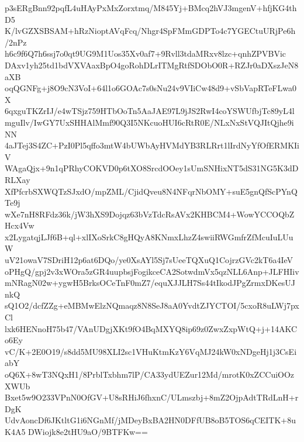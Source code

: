 p3sERgBnn92pqfL4uHAyPxMxZorxtmq/M845Yj+BMcq2hVJ3mgenV+hfjKG4thD5
K/lvGZXSBSAM+hRzNioptAVqFcq/Nhgr4SpFMmGDPTo4c7YGECtuURjPe6h/2nPz
h6c9f6Q7h6ssj7o0qt9UG9M1Uos35Xv0af7+9Rvll3tdaMRxv8lzc+qnhZPVBVic
DAxv1yh25td1bdVXVAaxBpO4goRohDLrITMgRtfSDObO0R+RZJr0aDXszJeN8aXB
oqQGNFg+j8O9cN3VoI+64l1o6GOAc7s0sNu24v9VIiCw48d9+vSbVapRTeFLwa0X
6qxguTKZrIJ/e4wTSjz759HTbOoTn5AaJAE97L9jJS2RwI4coYSWUfbjTc89yL4l
mguIlv/IwGY7UxSHHAlMmf90Q3I5NKcuoHUI6cRtR0E/NLxNxStVQJItQjhe9iNN
4aJTej3S4ZC+PzI0Pl5qffo3mtW4bUWbAyHVMdYB3RLRrt1lIrdNyYfOfERMKIiV
WAgaQjx+9n1qPRhyCOKVD0p6tXO8SrcdOOey1sUmSNHixNT5dS31NG5K3dDRLXay
XfPfcrbSXWQTzSJxdO/mpZML/CjidQveu8N4NFqrNbOMY+suE5gnQfScPYnQTe9j
wXe7nH8RFdz36k/jW3hXS9Dojqz63bVzTdcRsAVx2KHBCM4+WowYCCOQbZHcx4Vw
x2LygatqjLJf6B+ql+xlIXoSrkC8gHQyA8KNmxLhzZ4swiiRWGmfrZfMcuIuLUuW
uV21owaV7SDriH12p6at6DQo/ye0XsAYl5Sj7sUeeTQXuQ1CojrzGVc2kT6a4IeV
oPHgQ/gpj2v3xWOra5zGR4uupbsjFogikceCA2SotwdmVx5qzNLL6Anp+JLFHIiv
mNRagN02w+ygwH5BrksOCeTnF0mZ7/equXJJLH7Ss44tIkodJPgZrmxDKesUJnkQ
sQ1O2/dcfZZg+eMBMwElzNQmaqz8N8SeJ8aA0YvdtZJYCTOI/5cxoR8uLWj7pxCl
lxk6HENnoH75b47/VAnUDgjXKt9fO4BqMXYQ8ip69z0ZwxZxpWtQ+j+14AKCo6Ey
vC/K+2E0O19/s8dd5MU98XLI2sc1VHuKtmKzY6VqMJ24kW0xNDgeHj1j3CsEiabY
oQ6X+8wT3NQxH1/8PrblTxbhm7lP/CA33ydUEZur12Md/mrotK0xZCCuiOOzXWUb
Bxet5w9O233VPnN0OfGV+U8sRHiJ6fhxnC/ULmszbj+8mZ2OjpAdtTRdLnH+rDgK
UdvAoncDf6JKtltG1i6NGnMf/jMDeyBxBA2HN0DFfUB8oB5TOS6qCEITK+8uK4A5
DWiojk8e2tHU9aO/9BTFKw==
